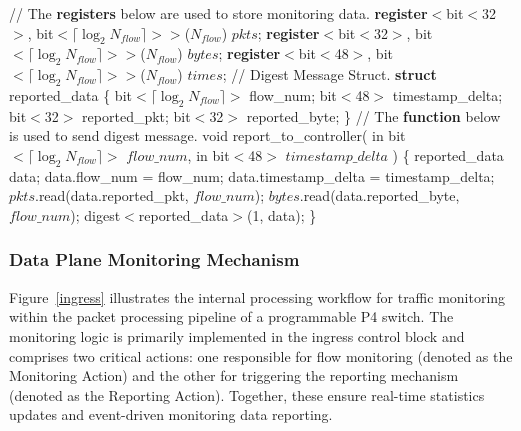 \begin{algorithm}[!t]
    \caption{Monitoring data report}
    \label{algo_report}
    \begin{algorithmic}[1]
        \STATE // The \textbf{registers} below are used to store monitoring data.
        \STATE \textbf{register}$<$bit$<$32$>$, bit$<\lceil \log_2 N_{flow} \rceil>>$($N_{flow}$) $pkts$;
        \STATE \textbf{register}$<$bit$<$32$>$, bit$<\lceil \log_2 N_{flow} \rceil>>$($N_{flow}$) $bytes$;
        \STATE \textbf{register}$<$bit$<$48$>$, bit$<\lceil \log_2 N_{flow} \rceil>>$($N_{flow}$) $times$;
        \STATE
        \STATE // Digest Message Struct.
        \STATE \textbf{struct} reported\_data \{
        \STATE \hspace{1em} bit$<\lceil \log_2 N_{flow} \rceil>$ flow\_num;
        \STATE \hspace{1em} bit$<$48$>$ timestamp\_delta;
        \STATE \hspace{1em} bit$<$32$>$ reported\_pkt;
        \STATE \hspace{1em} bit$<$32$>$ reported\_byte;
        \STATE \}
        \STATE
        \STATE // The \textbf{function} below is used to send digest message.
        \STATE void report\_to\_controller(
        \STATE \hspace{1em} in bit$<\lceil \log_2 N_{flow} \rceil>$ $flow\_num$,
        \STATE \hspace{1em} in bit$<$48$>$ $timestamp\_delta$
        \STATE ) \{
        \STATE \hspace{1em} reported\_data data;
        \STATE \hspace{1em} data.flow\_num = flow\_num;
        \STATE \hspace{1em} data.timestamp\_delta = timestamp\_delta;
        \STATE \hspace{1em} $pkts$.read(data.reported\_pkt, $flow\_num$);
        \STATE \hspace{1em} $bytes$.read(data.reported\_byte, $flow\_num$);
        \STATE \hspace{1em} digest$<$reported\_data$>$(1, data);
        \STATE \}
    \end{algorithmic}
\end{algorithm}

\subsubsection{Data Plane Monitoring Mechanism}

Figure~\ref{ingress} illustrates the internal processing workflow for traffic monitoring within the packet processing pipeline of a programmable P4 switch. 
The monitoring logic is primarily implemented in the ingress control block and comprises two critical actions: one responsible for flow monitoring (denoted as the Monitoring Action) and the other for triggering the reporting mechanism (denoted as the Reporting Action). 
Together, these ensure real-time statistics updates and event-driven monitoring data reporting.

